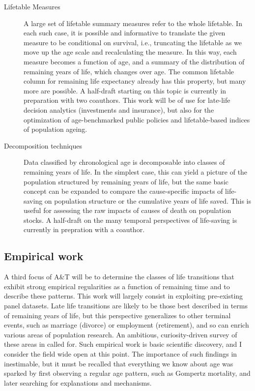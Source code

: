 \documentclass[a4paper,12pt]{article}
\begin{document}
\begin{description}
\item[Lifetable Measures]{A large set of lifetable summary measures refer to
the whole lifetable. In each such case, it is possible and
informative to translate the given measure to be conditional on survival, i.e.,
truncating the lifetable as we move up the age scale and recalculating the
measure. In this way, each measure becomes a function of age, and a summary of
the distribution of remaining years of life, which changes over age. The common
lifetable column for remaining life expectancy already has this property, but many more are possible. A half-draft
starting on this topic is currently in preparation with two coauthors.
This work will be of use for late-life decision analytics (investments and
insurance), but also for the optimization of age-benchmarked public policies
and lifetable-based indices of population ageing.}
\item[Decomposition techniques]{Data classified by chronological age is
decomposable into classes of remaining years of life. In the simplest case,
this can yield a picture of the population structured by remaining years of life, but
the same basic concept can be expanded to compare the cause-specific impacts of
life-saving on population structure or the cumulative
years of life saved. This is useful for assessing the raw impacts of causes of
death on population stocks. A half-draft on the many temporal perspectives of
life-saving is currently in prepration with a coauthor.}
\end{description}

\subsection{Empirical work}
A third focus of A\&T will be to determine the classes of
life transitions that exhibit strong empirical regularities as a function
of remaining time and to describe these patterns. This work will largely consist
in exploiting pre-existing panel datasets. Late life transitions are likely to
be those best described in terms of remaining years of life, but this
perspective generalizes to other terminal events, such as marriage (divorce) or
employment (retirement), and so can enrich various areas of population
research. An ambitious, curiosity-driven survey of these areas in called for.
Such empirical work is basic scientific discovery, and I consider the field wide
open at this point. The importance of such findings in inestimable, but it must
be recalled that everything we know about age was sparked by first observing a
regular age pattern, such as Gompertz mortality, and later
searching for explanations and mechanisms.
\end{document}
